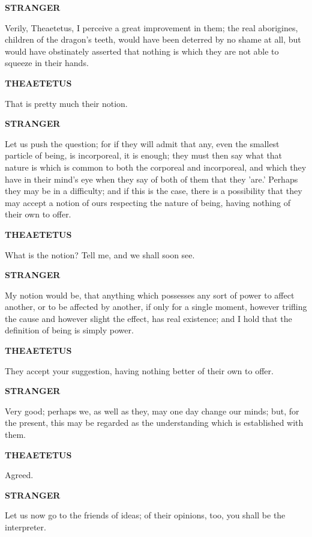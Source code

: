\documentclass[11pt,letter]{article}
\begin{document}
\par \textbf{STRANGER}
\par   Verily, Theaetetus, I perceive a great improvement in them; the real aborigines, children of the dragon's teeth, would have been deterred by no shame at all, but would have obstinately asserted that nothing is which they are not able to squeeze in their hands.

\par \textbf{THEAETETUS}
\par   That is pretty much their notion.

\par \textbf{STRANGER}
\par   Let us push the question; for if they will admit that any, even the smallest particle of being, is incorporeal, it is enough; they must then say what that nature is which is common to both the corporeal and incorporeal, and which they have in their mind's eye when they say of both of them that they 'are.' Perhaps they may be in a difficulty; and if this is the case, there is a possibility that they may accept a notion of ours respecting the nature of being, having nothing of their own to offer.

\par \textbf{THEAETETUS}
\par   What is the notion? Tell me, and we shall soon see.

\par \textbf{STRANGER}
\par   My notion would be, that anything which possesses any sort of power to affect another, or to be affected by another, if only for a single moment, however trifling the cause and however slight the effect, has real existence; and I hold that the definition of being is simply power.

\par \textbf{THEAETETUS}
\par   They accept your suggestion, having nothing better of their own to offer.

\par \textbf{STRANGER}
\par   Very good; perhaps we, as well as they, may one day change our minds; but, for the present, this may be regarded as the understanding which is established with them.

\par \textbf{THEAETETUS}
\par   Agreed.

\par \textbf{STRANGER}
\par   Let us now go to the friends of ideas; of their opinions, too, you shall be the interpreter.
\end{document}
